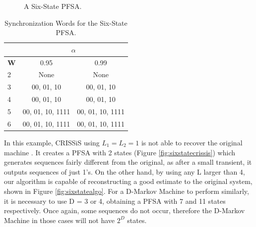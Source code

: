 {\begin{figure}
\centering
{}
\caption{A Six-State PFSA.\label{fig:sixstate}}
\end{figure}

\begin{table}
\centering
\begin{tabular}{|l|c|c|}
\hline
 & \multicolumn{2}{c|}{\textbf{$\alpha$}}\\
 \hline
\textbf{W} & 0.95 & 0.99 \\
\hline
2 & None & None \\ 
3 & 00, 01, 10  & 00, 01, 10 \\ 
4 & 00, 01, 10  & 00, 01, 10 \\ 
5 & 00, 01, 10, 1111  & 00, 01, 10, 1111 \\
6 & 00, 01, 10, 1111  & 00, 01, 10, 1111 \\
 \hline
\end{tabular}
\caption{Synchronization Words for the Six-State PFSA. \label{tab:tswsynch}}
\end{table}

In this example, CRISSiS using $L_1 = L_2 = 1$ is not able to recover the original machine . It creates a PFSA with 2 states (Figure \ref{fig:sixstatecrissis}) which generates sequences fairly different from the original, as after a small transient, it outputs sequences of just 1's. On the other hand, by using any L larger than 4, our algorithm is capable of reconstructing a good estimate to the original system, shown in Figure \ref{fig:sixstatealgo}. For a D-Markov Machine to perform similarly, it is necessary to use D = 3 or 4, obtaining a PFSA with 7 and 11 states respectively. Once again, some sequences do not occur, therefore the D-Markov Machine in those cases will not have $2^D$ states.

}
